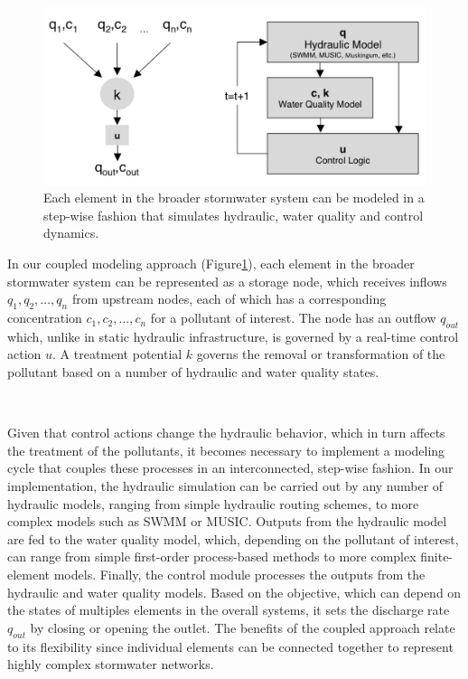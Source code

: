 \

\begin{figure}
\centering
  \includegraphics[width=\linewidth]{gfx/Chapter-1/coupled_model.png}
  \caption{Each element in the broader stormwater system can be modeled in a step-wise fashion that simulates hydraulic, water quality and control dynamics.}\label{fig-ch1:framework}
\end{figure}

In our coupled modeling approach (Figure\ref{fig-ch1:framework}), each element in the
broader stormwater system can be represented as a storage node, which receives
inflows $q_1,q_2,\ldots,q_n$ from upstream nodes, each of which has a corresponding concentration $c_1,c_2,\ldots,c_n$ for a pollutant of interest.
The node has an outflow $q_{out}$ which, unlike in static hydraulic infrastructure, is governed by a real-time control action $u$. 
A treatment potential $k$ governs the removal or transformation of the pollutant based on a number of hydraulic and water quality states.
 
\

Given that control actions change the hydraulic behavior, which in turn affects the treatment of the pollutants, it becomes necessary to implement a modeling cycle that couples these processes in an interconnected, step-wise fashion. 
In our implementation, the hydraulic simulation can be carried out by any number of hydraulic models, ranging from simple hydraulic routing schemes, to more complex models such as SWMM or MUSIC\@.
Outputs from the hydraulic model are fed to the water quality model, which, depending on the pollutant of interest, can range from simple first-order process-based methods to more complex finite-element models.
Finally, the control module processes the outputs from the hydraulic and water quality models.
Based on the objective, which can depend on the states of multiples elements in the overall systems, it sets the discharge rate $q_{out}$  by closing or opening the outlet.
The benefits of the coupled approach relate to its flexibility since individual elements can be connected together to represent highly complex stormwater networks.

